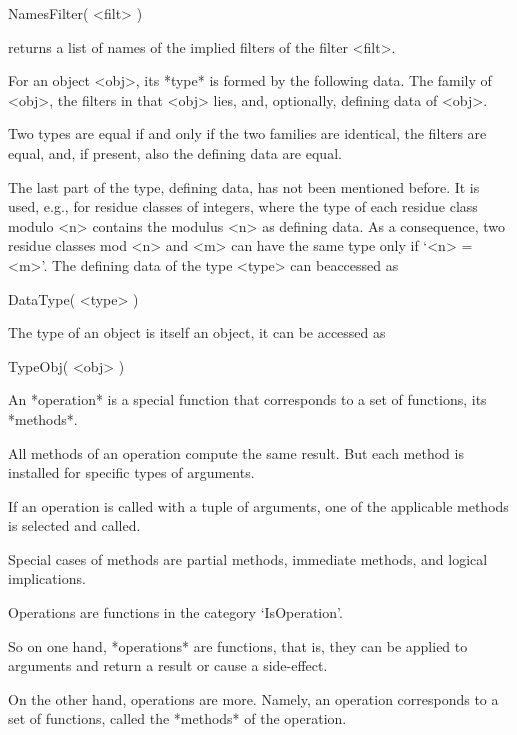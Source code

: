 \>NamesFilter( <filt> )

returns a list of names of the implied filters of the filter <filt>.


For an object <obj>, its *type* is formed by the following data.
The family of <obj>,
the filters in that <obj> lies,
and, optionally, defining data of <obj>.

Two types are equal if and only if the two families are identical,
the filters are equal, and, if present, also the defining data are equal.

The last part of the type, defining data, has not been mentioned before.
It is used, e.g., for residue classes of integers, where the type of each
residue class modulo <n> contains the modulus <n> as defining data.
As a consequence, two residue classes mod <n> and <m> can have the same
type only if `<n> = <m>'.
The defining data of the type <type> can beaccessed as

\>DataType( <type> )

The type of an object is itself an object,
it can be accessed as

\>TypeObj( <obj> )


An *operation* is a special {\GAP} function that corresponds to a set of
functions, its *methods*.

All methods of an operation compute the same result.
But each method is installed for specific types of arguments.

If an operation is called with a tuple of arguments,
one of the applicable methods is selected and called.

Special cases of methods are partial methods, immediate methods,
and logical implications.


Operations are functions in the category `IsOperation'.

So on one hand, *operations* are {\GAP} functions, that is,
they can be applied to arguments and return a result or cause a
side-effect.

On the other hand, operations are more.
Namely, an operation corresponds to a set of {\GAP} functions,
called the *methods* of the operation.

